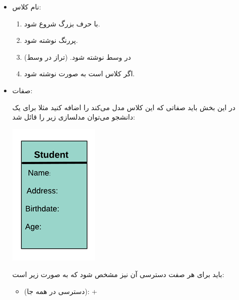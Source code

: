 \documentclass[]{article}
\begin{document}
\begin{itemize}[label=\textcolor{listColor}{$\blacklozenge$}]
  \item
   {\fehrest \textcolor{listColor}{نام کلاس:}}
   

   \begin{enumerate}

\item
   با حرف بزرگ شروع شود.
   
\item
پررنگ نوشته شود.

\item
در وسط نوشته شود. (تراز در وسط)

\item
اگر کلاس  است به صورت \textit{} نوشته شود.

   
   
   
   \end{enumerate}
  
  \newpage
  
  \item
   {\fehrest \textcolor{listColor}{صفات: }}

   
   در این بخش باید صفاتی که این کلاس مدل می‌کند را اضافه کنید مثلا برای یک دانشجو می‌توان مدلسازی زیر را قائل شد:
   
   
  \begin{center}

\includegraphics[]{images/image15.png}

\end{center}

باید برای هر صفت دسترسی آن نیز مشخص شود که به صورت زیر است:

\begin{itemize}[label={\textbullet}]

\item
{} (دسترسی در همه جا):    +


\end{itemize}
\end{itemize}
\end{document}

